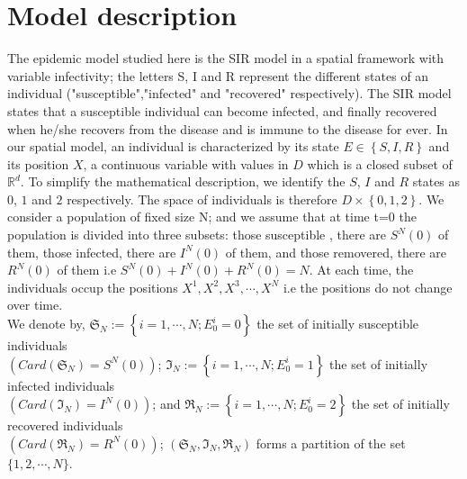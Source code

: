 \documentclass[notitlepage,reqno,11pt]{amsart}
\numberwithin{equation}{section}
\def\R{\mathbb{R}}
\begin{document}
\section{Model description}
\label{k}
The epidemic model studied here is the SIR model in a spatial framework with variable infectivity; the letters S, I and R represent the different states of an individual ("susceptible","infected" and "recovered" respectively). The SIR model states that a  susceptible individual can become infected, and finally  recovered when he/she recovers from the disease and is immune to the disease for ever. In our spatial model, an individual is characterized by its state $E\in \left\{ S, I, R \right\} $ and its position $X$, a continuous variable with values in $D$ which is a closed subset of $\R^d$. To simplify the mathematical description, we identify the $S$, $I$ and $R$ states as $0$, $1$ and $2$ respectively. The  space of individuals is therefore $D\times \left\{ 0, 1, 2 \right\} $. We consider a population of fixed size N; and we assume that at time t=0 the population is divided into three subsets: those susceptible , there are $S^N(0)$ of them, those infected, there are $I^N(0)$ of them, and those removered, there are $R^N(0)$ of them i.e $S^N(0)+I^N(0)+R^N(0)= N.$ At each time, the  individuals occup the positions $X^1, X^2, X^3, \cdots, X^N$ i.e the positions do not change over time.\\
 We denote by,  $\mathfrak{S}_N:=\left\{ i=1,\cdots,N; E^i_0=0\right\}$ the set of  initially susceptible individuals\\  $\left(Card(\mathfrak{S}_N)=S^N(0)\right)$; $\mathfrak{I}_N:=\left\{ i=1,\cdots,N; E^i_0=1\right\}$ the set of  initially infected individuals\\ $\left(Card(\mathfrak{I}_N)=I^N(0)\right)$; and $\mathfrak{R}_N:=\left\{ i=1,\cdots,N; E^i_0=2\right\}$ the set of  initially recovered individuals\\ $\left(Card(\mathfrak{R}_N)=R^N(0)\right)$; $(\mathfrak{S}_N,\mathfrak{I}_N,\mathfrak{R}_N)$ forms a partition of the set $\{1, 2, \cdots, N\}$.
\end{document}
